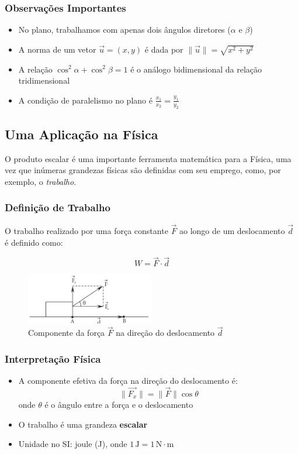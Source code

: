 \subsubsection*{Observações Importantes}
\begin{itemize}
    \item No plano, trabalhamos com apenas dois ângulos diretores ($\alpha$ e $\beta$)
    \item A norma de um vetor $\vec{u} = (x,y)$ é dada por $\|\vec{u}\| = \sqrt{x^2 + y^2}$
    \item A relação $\cos^2\alpha + \cos^2\beta = 1$ é o análogo bidimensional da relação tridimensional
    \item A condição de paralelismo no plano é $\frac{x_1}{x_2} = \frac{y_1}{y_2}$
\end{itemize}

\subsection{Uma Aplicação na Física}

O produto escalar é uma importante ferramenta matemática para a Física, uma vez
que inúmeras grandezas físicas são definidas com seu emprego, como, por exemplo,
o \textit{trabalho}.

\subsubsection*{Definição de Trabalho}
O trabalho realizado por uma força constante $\vec{F}$ ao longo de um
deslocamento $\vec{d}$ é definido como:

\begin{equation*}
  W = \vec{F} \cdot \vec{d}
\end{equation*}

\begin{figure}[h]
    \centering
    \includegraphics[width=0.5\textwidth]{./fig/fig2.12.png}
    \caption{Componente da força $\vec{F}$ na direção do deslocamento $\vec{d}$}
    \label{fig:fig2.12}
\end{figure}

\subsubsection*{Interpretação Física}
\begin{itemize}
  \item A componente efetiva da força na direção do deslocamento é:
  \[
  \|\vec{F_x}\| = \|\vec{F}\| \cos\theta
  \]
  onde $\theta$ é o ângulo entre a força e o deslocamento
  
  \item O trabalho é uma grandeza \textbf{escalar}
  
  \item Unidade no SI: joule (J), onde $1\,\text{J} = 1\,\text{N} \cdot \text{m}$
\end{itemize}

